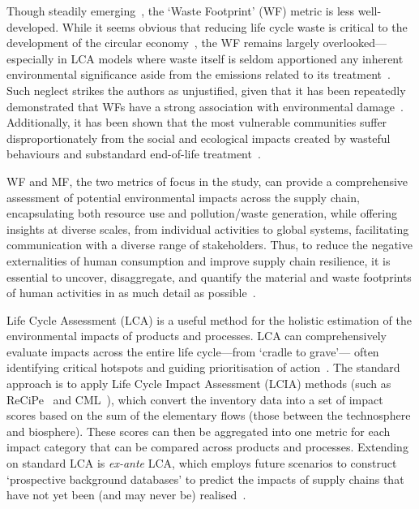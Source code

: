 \documentclass[a4paper,fleqn,longmktitle]{cas-dc}
\begin{document}
Though steadily emerging~\citep{laurenti2016wastefootprint,demirer2019wastefootprint,guillotreau2023wastefootprint}, the `Waste Footprint' (WF) metric is less well-developed. While it seems obvious that reducing life cycle waste is critical to the development of the circular economy~\citep{towa2020wastefootprint,ellenmacarthur2015ce}, the WF remains largely overlooked---especially in LCA models where waste itself is seldom apportioned any inherent environmental significance aside from the emissions related to its treatment~\citep{laurenti2023wastefootprint}. Such neglect strikes the authors as unjustified, given that it has been repeatedly demonstrated that WFs have a strong association with environmental damage~\citep{laurenti2023wastefootprint,doka2024publications, ridoutt2010wasteimpacts,jaio2013wasteabsorbtionfootprint}. Additionally, it has been shown that the most vulnerable communities suffer disproportionately from the social and ecological impacts created by wasteful behaviours and substandard end-of-life treatment~\citep{pellow2023envjusticewaste,akese2018envjustice}.

WF and MF, the two metrics of focus in the study, can provide a comprehensive assessment of potential environmental impacts across the supply chain, encapsulating both resource use and pollution/waste generation, while offering insights at diverse scales, from individual activities to global systems, facilitating communication with a diverse range of stakeholders. Thus, to reduce the negative externalities of human consumption and improve supply chain resilience, it is essential to uncover, disaggregate, and quantify the material and waste footprints of human activities in as much detail as possible~\citep{bisinella2024wastelca, towa2020wastefootprint,berger2020mineralsinlca,sonderegger2020mineralsinlca}.

Life Cycle Assessment (LCA) is a useful method for the holistic estimation of the environmental impacts of products and processes. LCA can comprehensively evaluate impacts across the entire life cycle---from `cradle to grave'--- often identifying critical hotspots and guiding prioritisation of action~\citep{guinee2011lca}. The standard approach is to apply Life Cycle Impact Assessment (LCIA) methods (such as ReCiPe~\citep{huijbregts2016recipe} and CML~\citep{guinee2002cml}), which convert the inventory data into a set of impact scores based on the sum of the elementary flows (those between the technosphere and biosphere). These scores can then be aggregated into one metric for each impact category that can be compared across products and processes. Extending on standard LCA is \textit{ex-ante} LCA, which employs future scenarios to construct `prospective background databases' to predict the impacts of supply chains that have not yet been (and may never be) realised~\citep{cucurachi2018exante,blanco2020exante}.
\end{document}
